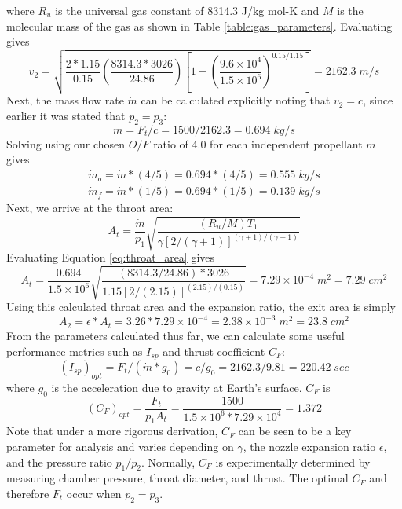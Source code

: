 \documentclass[9pt]{article} %
\numberwithin{equation}{section} %
\begin{document}
where $R_{u}$ is the universal gas constant of 8314.3 J/kg mol-K and $M$ is the molecular mass of the gas as shown in Table \ref{table:gas_parameters}. Evaluating gives
\begin{equation*} 
v_{2} = \sqrt{ \frac{2 * 1.15}{0.15} \left( \frac{8314.3 * 3026}{24.86} \right) \left[ 1- \left( \frac{9.6 \times 10^{4}}{1.5 \times 10^{6}} \right) ^{0.15/1.15} \right] } = 2162.3 \; m/s
\end{equation*}
Next, the mass flow rate $\dot{m}$ can be calculated explicitly noting that $v_{2} = c$, since earlier it was stated that $p_{2} = p_{3}$:
\begin{equation} \label{eq:mdot}
\dot{m} = F_{t}/c = 1500/2162.3 = 0.694 \; kg/s
\end{equation}
Solving using our chosen $O/F$ ratio of 4.0 for each independent propellant $\dot{m}$ gives
\begin{align*} 
\dot{m}_{o} = \dot{m} * (4/5) = 0.694 * (4/5) = 0.555 \; kg/s \\
\dot{m}_{f} = \dot{m} * (1/5) = 0.694 * (1/5) = 0.139 \; kg/s
\end{align*}
Next, we arrive at the throat area:
\begin{equation} \label{eq:throat_area}
A_{t} = \frac{\dot{m}}{p_{1}} \sqrt{ \frac{(R_{u}/M)T_{1}}{\gamma [2/(\gamma + 1)]^{(\gamma + 1)/(\gamma - 1)}} }
\end{equation}
Evaluating Equation \ref{eq:throat_area} gives
\begin{equation*} 
A_{t} = \frac{0.694}{1.5 \times 10^{6}} \sqrt{ \frac{(8314.3/24.86) * 3026}{1.15 [2/(2.15)]^{(2.15)/(0.15)}} } = 7.29 \times 10^{-4} \; m^{2} = 7.29 \; cm^{2}
\end{equation*}
Using this calculated throat area and the expansion ratio, the exit area is simply
\begin{equation} \label{eq:exit_area}
A_{2} = \epsilon * A_{t} = 3.26 * 7.29 \times 10 ^{-4} = 2.38 \times 10^{-3} \; m^{2} = 23.8 \; cm^{2}
\end{equation}
From the parameters calculated thus far, we can calculate some useful performance metrics such as $I_{sp}$ and thrust coefficient $C_{F}$:
\begin{equation} \label{eq:specific_impulse}
(I_{sp})_{opt} = F_{t}/(\dot{m} * g_{0}) = c/g_{0} = 2162.3/9.81 = 220.42 \; sec
\end{equation}
where $g_{0}$ is the acceleration due to gravity at Earth's surface. $C_{F}$ is
\begin{equation} \label{eq:thrust_coefficient}
(C_{F})_{opt} = \frac{F_{t}}{p_{1}A_{t}} = \frac{1500}{1.5 \times 10^{6} * 7.29 \times 10 ^{4}} = 1.372
\end{equation}
Note that under a more rigorous derivation, $C_{F}$ can be seen to be a key parameter for analysis and varies depending on $\gamma$, the nozzle expansion ratio $\epsilon$, and the pressure ratio $p_{1}/p_{2}$. Normally, $C_{F}$ is experimentally determined by measuring chamber pressure, throat diameter, and thrust. The optimal $C_{F}$ and therefore $F_{t}$ occur when $p_{2} = p_{3}$.
\end{document}
